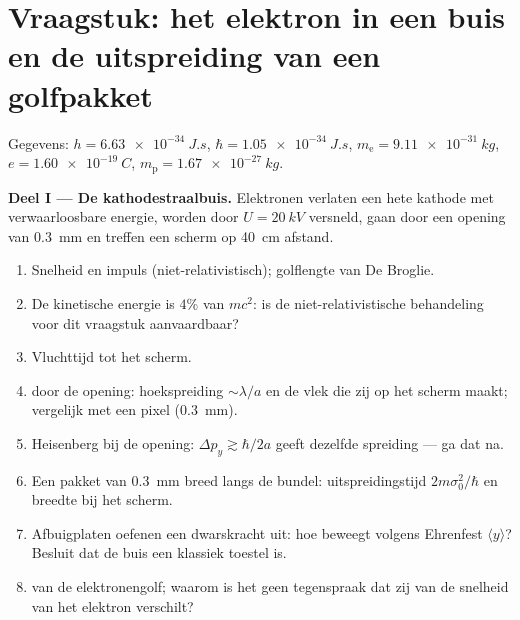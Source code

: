 \section{Vraagstuk: het elektron in een buis en de uitspreiding van een golfpakket}

\begin{problem}\label{pb:b2:schrodinger-wave-functions:1}
Gegevens: $h = \qty{6.63e-34}{J.s}$, $\hbar = \qty{1.05e-34}{J.s}$,
$m_{\text{e}} =
\qty{9.11e-31}{kg}$, $e = \qty{1.60e-19}{C}$,
$m_{\text{p}} = \qty{1.67e-27}{kg}$.

\textbf{Deel I --- De kathodestraalbuis.}
Elektronen verlaten een hete kathode met verwaarloosbare energie, worden
door $U = \qty{20}{kV}$ versneld, gaan door een opening van \qty{0.3}{mm} en
treffen een
scherm op \qty{40}{cm} afstand.
\begin{enumerate}
  \item Snelheid en impuls (niet-relativistisch); golflengte van De Broglie.
  \item De kinetische energie is $4\%$ van $mc^2$: is de niet-relativistische
        behandeling voor dit vraagstuk aanvaardbaar?
  \item Vluchttijd tot het scherm.
  \item {} door de opening: hoekspreiding $\sim\lambda/a$ en
        de vlek die zij op het scherm maakt; vergelijk met een pixel
        (\qty{0.3}{mm}).
  \item Heisenberg bij de opening: $\Delta p_y \gtrsim \hbar/2a$ geeft dezelfde
        spreiding --- ga dat na.
  \item Een pakket van \qty{0.3}{mm} breed langs de bundel: uitspreidingstijd
        $2m\sigma_0^2/\hbar$ en breedte bij het scherm.
  \item Afbuigplaten oefenen een dwarskracht uit: hoe beweegt volgens Ehrenfest
        $\langle y\rangle$? Besluit dat de buis een
        klassiek toestel is.
  \item {} van de elektronengolf; waarom is het geen tegenspraak dat
        zij van de snelheid van het elektron verschilt?
\end{enumerate}


\end{problem}
